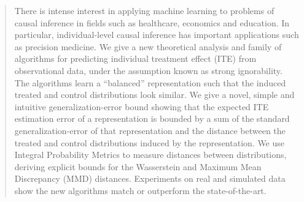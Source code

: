 \documentclass{article}
\begin{document}

\begin{abstract}
There is intense interest in applying machine learning to problems of causal inference in fields such as healthcare, economics and education. In particular, individual-level causal inference has important applications such as precision medicine. We give a new theoretical analysis and family of algorithms for predicting individual treatment effect (ITE) from observational data, under the assumption known as strong ignorability. The algorithms learn a ``balanced'' representation such that the induced treated and control distributions look similar. We give a novel, simple and intuitive generalization-error bound showing that the expected ITE estimation error of a representation is bounded by a sum of the standard generalization-error of that representation and the distance between the treated and control distributions induced by the representation. We use Integral Probability Metrics to measure distances between distributions, deriving explicit bounds for the Wasserstein and Maximum Mean Discrepancy (MMD) distances. Experiments on real and simulated data show the new algorithms match or outperform the state-of-the-art.
\end{abstract}

%







\end{document}
